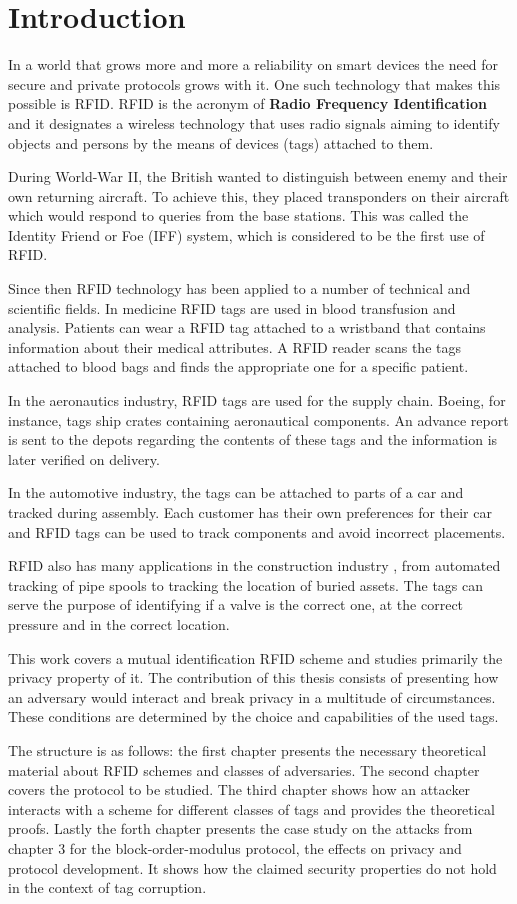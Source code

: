\chapter*{Introduction} 

    In a world that grows more and more a reliability on smart devices the need for secure and private protocols grows with it. One 
such technology that makes this possible is RFID. RFID is the acronym of \textbf{Radio Frequency Identification} and it designates
a wireless technology that uses radio signals aiming to identify objects and persons by the means of devices (tags) attached to them.

    During World-War II, the British wanted to distinguish between enemy and their own returning aircraft. To achieve this, they placed transponders
on their aircraft which would respond to queries from the base stations. This was called the Identity Friend or Foe (IFF) system, which is considered to be the
first use of RFID.

    Since then RFID technology has been applied to a number of technical and scientific fields. In medicine RFID tags are used in blood 
transfusion and analysis. Patients can wear a RFID tag attached to a wristband that contains information about their medical attributes. 
A RFID reader scans the tags attached to blood bags and finds the appropriate one for a specific patient. 

In the aeronautics industry, RFID tags are used for the supply chain. Boeing, for instance, tags ship crates containing aeronautical
components. An advance report is sent to the depots regarding the contents of these tags and the information is later verified on delivery.

In the automotive industry, the tags can be attached to parts of a car and tracked during assembly. Each customer has their own preferences
for their car and RFID tags can be used to track components and avoid incorrect placements. 

RFID also has many applications in the construction industry \cite{Domdouzis}, from automated tracking of pipe spools to tracking the 
location of buried assets. The tags can serve the purpose of identifying if a valve is the correct one, at the correct pressure and 
in the correct location. 

This work covers a mutual identification RFID scheme and studies primarily the privacy property of it. The contribution of this thesis
consists of presenting how an adversary would interact and break privacy in a multitude of circumstances. These conditions are determined
by the choice and capabilities of the used tags. 

The structure is as follows: the first chapter presents the necessary theoretical material about RFID schemes and classes of adversaries.
The second chapter covers the protocol to be studied. The third chapter shows how an attacker interacts with a scheme for different 
classes of tags and provides the theoretical proofs. Lastly the forth chapter presents the case study on the attacks from chapter 3 
for the block-order-modulus protocol, the effects on privacy and protocol development. It shows how the claimed security properties do 
not hold in the context of tag corruption. 